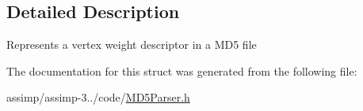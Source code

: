 \subsection{Detailed Description}
Represents a vertex weight descriptor in a M\+D5 file 

The documentation for this struct was generated from the following file\+:\begin{DoxyCompactItemize}
\item 
assimp/assimp-\/3../code/\hyperlink{_m_d5_parser_8h}{M\+D5\+Parser.\+h}\end{DoxyCompactItemize}
